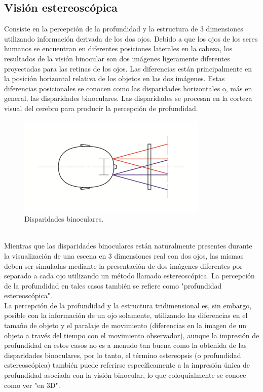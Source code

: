 \documentclass[12pt]{article}
\begin{document}
\subsection{Visión estereoscópica}
Consiste en la percepción de la profundidad y la estructura de 3 dimensiones utilizando información derivada de los dos ojos. Debido a que los ojos de los seres humanos se encuentran en diferentes posiciones laterales en la cabeza, los resultados de la visión binocular son dos imágenes ligeramente diferentes proyectadas para las retinas de los ojos. Las diferencias están principalmente en la posición horizontal relativa de los objetos en las dos imágenes. Estas diferencias posicionales se conocen como las disparidades horizontales o, más en general, las disparidades binoculares. Las disparidades se procesan en la corteza visual del cerebro para producir la percepción de profundidad\cite{visionest}. 
\begin{figure}[h!]
\includegraphics[width =0.7\linewidth, center]{ojos.png}
\caption{Disparidades binoculares.}
\label{ fig : surface }
\end{figure}
\\Mientras que las disparidades binoculares están naturalmente presentes durante la visualización de una escena en 3 dimensiones real con dos ojos, las mismas deben ser simuladas mediante la presentación de dos imágenes diferentes por separado a cada ojo utilizando un método llamado estereoscópica. La percepción de la profundidad en tales casos también se refiere como "profundidad estereoscópica". 
\\La percepción de la profundidad y la estructura tridimensional  es, sin embargo, posible con la información de un ojo solamente, utilizando las diferencias en el tamaño de objeto y el paralaje de movimiento (diferencias en la imagen de un objeto a través del tiempo con el movimiento observador), aunque la impresión de profundidad en estos casos no es a menudo tan buena como la obtenida de las disparidades binoculares, por lo tanto, el término estereopsis (o profundidad estereoscópica) también puede referirse específicamente a la impresión única de profundidad asociada con la visión binocular, lo que coloquialmente se conoce como ver "en 3D".
\end{document}
